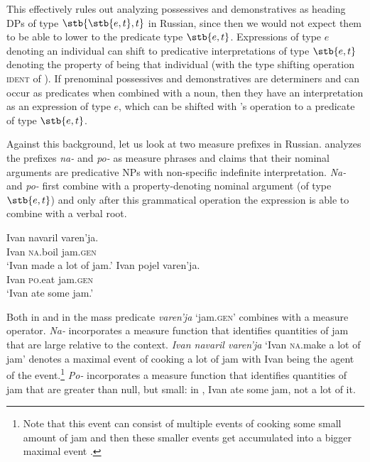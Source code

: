 \documentclass[output=paper,
colorlinks,
citecolor=brown,
newtxmath
]{langscibook}
\begin{document}

\z

\noindent This effectively rules out analyzing possessives and demonstratives as heading DPs of type $\stb{\stb{e,t}, t}$ in Russian, since then we would not expect them to be able to lower to the predicate type $\stb{e,t}$.
Expressions of type $e$ denoting an individual can shift to predicative interpretations of type $\stb{e,t}$ denoting the property of being that individual (with the type shifting operation \textsc{ident} of \citealt{Partee1987}). If prenominal possessives and demonstratives are determiners and can occur as predicates when combined with a noun, then they have an interpretation as an expression of type $e$, which can be shifted with \citeauthor{Partee1987}'s operation to a predicate of type $\stb{e,t}$. 

Against this background, let us look at two measure prefixes in Russian. \citet{Filip2005} analyzes the prefixes \textit{na-} and \textit{po-} as measure phrases and claims that their nominal arguments are predicative NPs with non-specific indefinite interpretation. \textit{Na-} and \textit{po-} first combine with a property-denoting nominal argument (of type $\stb{e,t}$) and only after this grammatical operation the expression is able to combine with a verbal root. 


\ea\label{napo-demonstratives}
    \ea\label{navaril} \gll Ivan navaril varen'ja.\\
    Ivan {\textsc{na}.boil} jam.\textsc{gen}\\
    \glt `Ivan made a lot of jam.'
    \ex\label{pojel} \gll Ivan pojel varen'ja.\\
    Ivan {\textsc{po}.eat} jam.\textsc{gen}\\
    \glt `Ivan ate some jam.'
\z\z

\noindent Both in  and in  the mass predicate \textit{varen'ja} `jam.\textsc{gen}' combines with a measure operator. \textit{Na-} incorporates a measure function that identifies quantities of jam that are large relative to the context. \textit{Ivan navaril varen'ja} `Ivan \textsc{na}.make a lot of jam' denotes a maximal event of cooking a lot of jam with Ivan being the agent of the event.\footnote{Note that this event can consist of multiple events of cooking some small amount of jam and then these smaller events get accumulated into a bigger maximal event \citep{Filip.Rothstein2006}.} \textit{Po-} incorporates a measure function that identifies quantities of jam that are greater than null, but small: in , Ivan ate some jam, not a lot of it.
\end{document}
